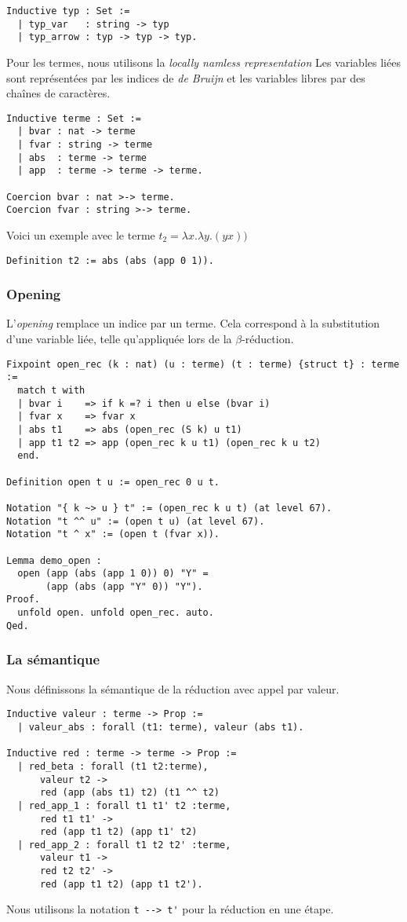 \begin{Verbatim}
Inductive typ : Set :=
  | typ_var   : string -> typ
  | typ_arrow : typ -> typ -> typ.
\end{Verbatim}

Pour les termes, nous utilisons la \textit{locally namless representation}
Les variables liées sont représentées par les indices de \textit{de Bruijn} et les variables 
libres par des chaînes de caractères.
\begin{Verbatim}
Inductive terme : Set :=
  | bvar : nat -> terme
  | fvar : string -> terme
  | abs  : terme -> terme
  | app  : terme -> terme -> terme.

Coercion bvar : nat >-> terme.
Coercion fvar : string >-> terme.
\end{Verbatim}
Voici un exemple avec le terme $t_2 = \lambda x.\lambda y. (y x)) $

\verb+Definition t2 := abs (abs (app 0 1)).+

\subsubsection{Opening}
L'\textit{opening} remplace un indice par un terme. 
Cela correspond à la substitution d'une variable liée, telle qu'appliquée lors de la 
$\beta$-réduction.

\begin{Verbatim}
Fixpoint open_rec (k : nat) (u : terme) (t : terme) {struct t} : terme :=
  match t with
  | bvar i    => if k =? i then u else (bvar i)
  | fvar x    => fvar x
  | abs t1    => abs (open_rec (S k) u t1)
  | app t1 t2 => app (open_rec k u t1) (open_rec k u t2)
  end.

Definition open t u := open_rec 0 u t.

Notation "{ k ~> u } t" := (open_rec k u t) (at level 67).
Notation "t ^^ u" := (open t u) (at level 67).
Notation "t ^ x" := (open t (fvar x)).

Lemma demo_open :
  open (app (abs (app 1 0)) 0) "Y" =
       (app (abs (app "Y" 0)) "Y").
Proof.
  unfold open. unfold open_rec. auto.
Qed.
\end{Verbatim}

\subsubsection{La sémantique} 
Nous définissons la sémantique de la réduction avec appel par valeur.

\begin{Verbatim}
Inductive valeur : terme -> Prop :=
  | valeur_abs : forall (t1: terme), valeur (abs t1).

Inductive red : terme -> terme -> Prop :=
  | red_beta : forall (t1 t2:terme),
      valeur t2 ->
      red (app (abs t1) t2) (t1 ^^ t2)
  | red_app_1 : forall t1 t1' t2 :terme,
      red t1 t1' ->
      red (app t1 t2) (app t1' t2)
  | red_app_2 : forall t1 t2 t2' :terme,
      valeur t1 ->
      red t2 t2' ->
      red (app t1 t2) (app t1 t2').

\end{Verbatim}
Nous utilisons la notation \verb+t --> t'+ pour la réduction en une étape.

